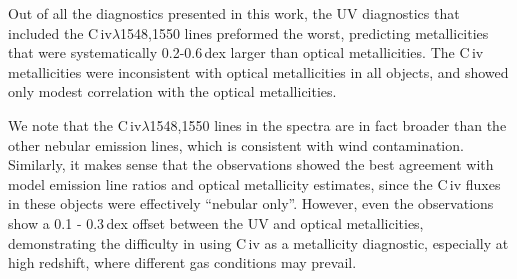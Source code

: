 \documentclass[preprint2]{aastex62}
\newcommand{\civ}{C\,{\sc iv}\xspace}
\begin{document}
Out of all the diagnostics presented in this work, the UV diagnostics that included the \civ$\lambda$1548,1550 lines preformed the worst, predicting metallicities that were systematically 0.2-0.6\,dex larger than optical metallicities. The \civ metallicities were inconsistent with optical metallicities in all objects, and showed only modest correlation with the optical metallicities.

We note that the \civ$\lambda$1548,1550 lines in the \citet{Berg+2016} spectra are in fact broader than the other nebular emission lines, which is consistent with wind contamination. Similarly, it makes sense that the \citet{Senchyna+2017} observations showed the best agreement with model emission line ratios and optical metallicity estimates, since the \civ fluxes in these objects were effectively ``nebular only''. However, even the \citet{Senchyna+2017} observations show a 0.1 - 0.3\,dex offset between the UV and optical metallicities, demonstrating the difficulty in using \civ as a metallicity diagnostic, especially at high redshift, where different gas conditions may prevail.


\end{document}
